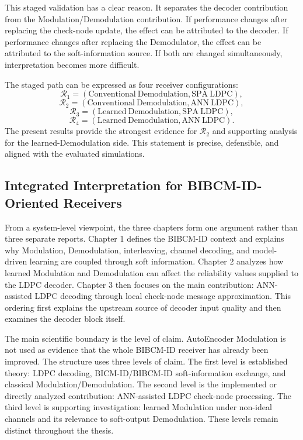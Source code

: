 This staged validation has a clear reason. It separates the decoder contribution from the Modulation/Demodulation contribution. If performance changes after replacing the check-node update, the effect can be attributed to the decoder. If performance changes after replacing the Demodulator, the effect can be attributed to the soft-information source. If both are changed simultaneously, interpretation becomes more difficult.

The staged path can be expressed as four receiver configurations:
\begin{equation}
  \mathcal{R}_1=(\mathrm{Conventional\ Demodulation},\mathrm{SPA\ LDPC}),
\end{equation}
\begin{equation}
  \mathcal{R}_2=(\mathrm{Conventional\ Demodulation},\mathrm{ANN\ LDPC}),
\end{equation}
\begin{equation}
  \mathcal{R}_3=(\mathrm{Learned\ Demodulation},\mathrm{SPA\ LDPC}),
\end{equation}
\begin{equation}
  \mathcal{R}_4=(\mathrm{Learned\ Demodulation},\mathrm{ANN\ LDPC}).
\end{equation}
The present results provide the strongest evidence for $\mathcal{R}_2$ and supporting analysis for the learned-Demodulation side. This statement is precise, defensible, and aligned with the evaluated simulations.

\subsection{Integrated Interpretation for BIBCM-ID-Oriented Receivers}
From a system-level viewpoint, the three chapters form one argument rather than three separate reports. Chapter 1 defines the BIBCM-ID context and explains why Modulation, Demodulation, interleaving, channel decoding, and model-driven learning are coupled through soft information. Chapter 2 analyzes how learned Modulation and Demodulation can affect the reliability values supplied to the LDPC decoder. Chapter 3 then focuses on the main contribution: ANN-assisted LDPC decoding through local check-node message approximation. This ordering first explains the upstream source of decoder input quality and then examines the decoder block itself.

The main scientific boundary is the level of claim. AutoEncoder Modulation is not used as evidence that the whole BIBCM-ID receiver has already been improved. The structure uses three levels of claim. The first level is established theory: LDPC decoding, BICM-ID/BIBCM-ID soft-information exchange, and classical Modulation/Demodulation. The second level is the implemented or directly analyzed contribution: ANN-assisted LDPC check-node processing. The third level is supporting investigation: learned Modulation under non-ideal channels and its relevance to soft-output Demodulation. These levels remain distinct throughout the thesis.

